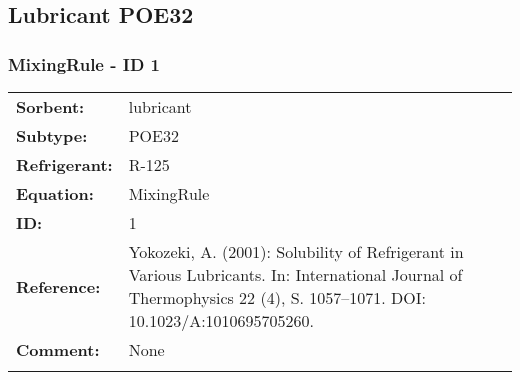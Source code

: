 \subsection{Lubricant POE32}
%
\subsubsection{MixingRule - ID 1}
%
\begin{tabular}[l]{|lp{11.5cm}|}
\hline
\addlinespace

\textbf{Sorbent:} & lubricant \\
\textbf{Subtype:} & POE32 \\
\textbf{Refrigerant:} & R-125 \\
\textbf{Equation:} & MixingRule \\
\textbf{ID:} & 1 \\
\textbf{Reference:} & Yokozeki, A. (2001): Solubility of Refrigerant in Various Lubricants. In: International Journal of Thermophysics 22 (4), S. 1057–1071. DOI: 10.1023/A:1010695705260. \\
\textbf{Comment:} & None \\

\addlinespace
\hline
\end{tabular}
\newline

